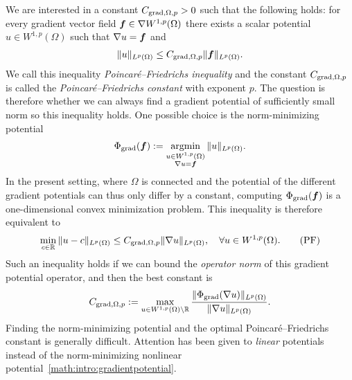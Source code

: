 \documentclass[10pt,a4paper]{article}
\begin{document}
We are interested in a constant $C_{\operatorname{grad},\Omega,p} > 0$ such that the following holds:
for every gradient vector field $\bm{f} \in \nabla W^{1,p}(\Omega)$ 
there exists a scalar potential $u \in W^{1,p}(\Omega)$
such that $\nabla u = \bm{f}$ and 
\begin{align}\label{math:intro:inequalitypf:gradient} 
    \| u \|_{L^{p}(\Omega)}
    \leq 
    C_{\operatorname{grad},\Omega,p} 
    \| \bm{f} \|_{L^{p}(\Omega)}
    .
\end{align}
We call this inequality \emph{Poincar\'e--Friedrichs inequality} and the constant $C_{\operatorname{grad},\Omega,p}$ is called the \emph{Poincar\'e--Friedrichs constant} with exponent $p$. 
The question is therefore whether we can always find a gradient potential of sufficiently small norm so this inequality holds. 
One possible choice is the norm-minimizing potential 
\begin{align}\label{math:intro:gradientpotential}
    \Phi_{\operatorname{grad}}( \bm{f} ) := \operatorname*{{\rm argmin}}\limits_{ \substack{ u \in W^{1,p}(\Omega) \\ \nabla u = \bm{f} } } \| u \|_{L^{p}(\Omega)}.
\end{align}
In the present setting, where $\Omega$ is connected and the potential of the different gradient potentials can thus only differ by a constant, computing $\Phi_{\operatorname{grad}}( \bm{f} )$ is a one-dimensional convex minimization problem. 
This inequality is therefore equivalent to  
\begin{align}\label{math:intro:poincarefriedrichs:grad}
    \min\limits_{c\in{\mathbb R}}
    \| u - c \|_{L^{p}(\Omega)}
    \leq 
    C_{\operatorname{grad},\Omega,p} \| \nabla u \|_{L^{p}(\Omega)},
    \quad 
    \forall
    u \in W^{1,p}(\Omega) 
    .\tag{PF} 
\end{align}
Such an inequality holds if we can bound the \emph{operator norm} of this gradient potential operator, and then the best constant is  
\begin{align}\label{math:intro:gradient:potentialnorm}
    C_{\operatorname{grad},\Omega,p} := \max\limits_{ u \in W^{1,p}(\Omega) \setminus {\mathbb R} } 
    \frac{ \| \Phi_{\operatorname{grad}}(\nabla u) \|_{L^{p}(\Omega)} }{ \| \nabla u \|_{L^{p}(\Omega)} }.
\end{align}
Finding the norm-minimizing potential and the optimal Poincar\'e--Friedrichs constant is generally difficult. 
Attention has been given to \emph{linear} potentials instead of the norm-minimizing nonlinear potential~\eqref{math:intro:gradientpotential}. 
\end{document}
